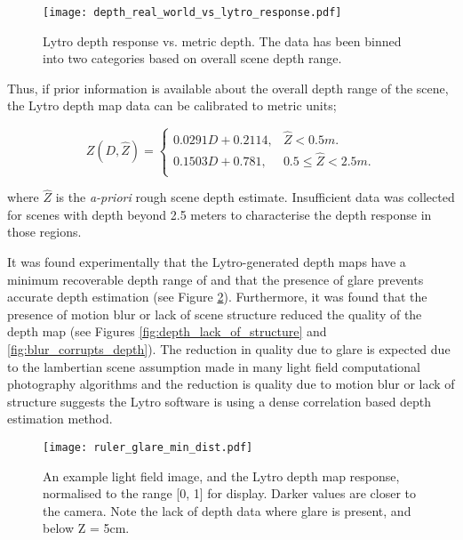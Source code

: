 \begin{figure}[h]
\centering
\caption[Lytro depth response vs. metric depth]{Lytro depth response vs. metric depth. The data has been binned into two categories based on overall scene depth range.}
\label{fig:depth_real_world_vs_lytro_response}
\texttt{[image: depth\_real\_world\_vs\_lytro\_response.pdf]}
\end{figure}

Thus, if prior information is available about the overall depth range of the scene, the Lytro depth map data can be calibrated to metric units;

\begin{equation}
\label{eq:lytro_dm_to_metric}
Z(D, \hat{Z}) = \begin{cases}
	0.0291 D + 0.2114, & \hat{Z} < 0.5m. \\
	0.1503 D + 0.781, & 0.5 \leq \hat{Z} < 2.5m. \\
\end{cases}
\end{equation}

\noindent
where $\hat{Z}$ is the \emph{a-priori} rough scene depth estimate.
Insufficient data was collected for scenes with depth beyond 2.5 meters to characterise the depth response in those regions.

It was found experimentally that the Lytro-generated depth maps have a minimum recoverable depth range of  and that the presence of glare prevents accurate depth estimation (see Figure \ref{fig:ruler_glare_min_dist}).
Furthermore, it was found that the presence of motion blur or lack of scene structure reduced the quality of the depth map (see Figures \ref{fig:depth_lack_of_structure} and \ref{fig:blur_corrupts_depth}).
The reduction in quality due to glare is expected due to the lambertian scene assumption made in many light field computational photography algorithms \cite{bishop2009light, liang2011light, baker2003shape} and the reduction is quality due to motion blur or lack of structure suggests the Lytro software is using a dense correlation based depth estimation method.


\begin{figure}
\centering
\texttt{[image: ruler\_glare\_min\_dist.pdf]}
\caption[Minimum depth map distance and the effect of glare]{
An example light field image, and the Lytro depth map response, normalised to the range [0, 1] for display.
Darker values are closer to the camera.
Note the lack of depth data where glare is present, and below Z = 5cm.
}
\label{fig:ruler_glare_min_dist}
\end{figure}


